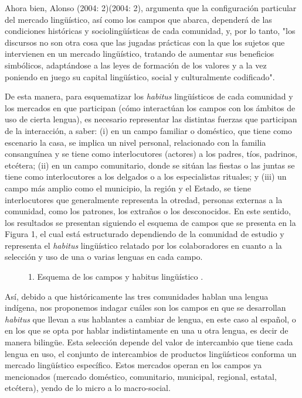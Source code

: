 \documentclass[output=paper]{../langscibook}
\begin{document}
Ahora bien, Alonso \citet[217]{Benito2004}(2004: 2)(2004: 2), argumenta que la configuración particular del mercado lingüístico, así como los campos que abarca, dependerá de las condiciones históricas y sociolingüísticas de cada comunidad, y, por lo tanto, "los discursos no son otra cosa que las jugadas prácticas con la que los sujetos que intervienen en un mercado lingüístico, tratando de aumentar sus beneficios simbólicos, adaptándose a las leyes de formación de los valores y a la vez poniendo en juego su capital lingüístico, social y culturalmente codificado".

De esta manera, para esquematizar los \textit{habitus} lingüísticos de cada comunidad y los mercados en que participan (cómo interactúan los campos con los ámbitos de uso de cierta lengua), es necesario representar las distintas fuerzas que participan de la interacción, a saber: (i) en un campo familiar o doméstico, que tiene como escenario la casa, se implica un nivel personal, relacionado con la familia consanguínea y se tiene como interlocutores (actores) a los padres, tíos, padrinos, etcétera; (ii) en un campo comunitario, donde se sitúan las fiestas o las juntas se tiene como interlocutores a los delgados o a los especialistas rituales; y (iii) un campo más amplio como el municipio, la región y el Estado, se tiene interlocutores que generalmente representa la otredad, personas externas a la comunidad, como los patrones, los extraños o los desconocidos. En este sentido, los resultados se presentan siguiendo el esquema de campos que se presenta en la Figura 1, el cual está estructurado dependiendo de la comunidad de estudio y representa el \textit{habitus} lingüístico relatado por los colaboradores en cuanto a la selección y uso de una o varias lenguas en cada campo.




\begin{figure}
\caption{\label{fig:}1. Esquema de los campos y habitus lingüístico \citep[309]{Guerrero2016}.}
\end{figure}

Así, debido a que históricamente las tres comunidades hablan una lengua indígena, nos proponemos indagar cuáles son los campos en que se desarrollan \textit{habitus} que llevan a sus hablantes a cambiar de lengua, en este caso al español, o en los que se opta por hablar indistintamente en una u otra lengua, es decir de manera bilingüe. Esta selección depende del valor de intercambio que tiene cada lengua en uso, el conjunto de intercambios de productos lingüísticos conforma un mercado lingüístico específico. Estos mercados operan en los campos ya mencionados (mercado doméstico, comunitario, municipal, regional, estatal, etcétera), yendo de lo micro a lo macro-social.
\end{document}
